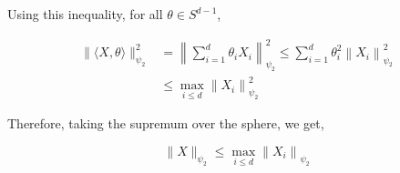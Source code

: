 \documentclass{article}
\begin{document}
Using this inequality, for all $\theta \in S^{d-1}$,

\begin{equation*}
  \begin{aligned}
    \|\langle X, \theta\rangle\|_{\psi_{2}}^{2} &=\left\|\sum_{i=1}^{d} \theta_{i} X_{i}\right\|_{\psi_{2}}^{2} \leq \sum_{i=1}^{d} \theta_{i}^{2}\left\|X_{i}\right\|_{\psi_{2}}^{2}\\
    & \leq \max_{i \leq d}\left\|X_{i}\right\|_{\psi_{2}}^{2}
  \end{aligned}
\end{equation*}

Therefore, taking the supremum over the sphere, we get, 

\begin{equation*}
  \|X\|_{\psi_{2}} \leq \max _{i \leq d}\left\|X_{i}\right\|_{\psi_{2}}
\end{equation*}


\end{document}
